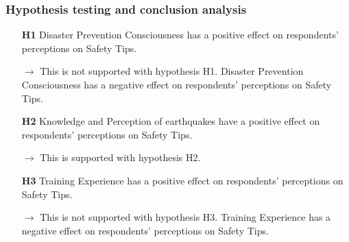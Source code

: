 \begin{table}[h]
  \caption{Discriminant Validity }
  \label{table36}
  \centering
{}
\end{table}

\subsubsection{Hypothesis testing and conclusion analysis}
\begin{itemize}
\item[\textbf{H1}] Disaster Prevention Consciousness has a positive effect on respondents' perceptions on Safety Tips.
\item[\textbf{$\longrightarrow$}] This is not supported with hypothesis H1. Disaster Prevention Consciousness has a negative effect on respondents' perceptions on Safety Tips.
\item[\textbf{H2}] Knowledge and Perception of earthquakes have a positive effect on respondents' perceptions on Safety Tips.
\item[\textbf{$\longrightarrow$}] This is supported with hypothesis H2. 
\item[\textbf{H3}] Training Experience has a positive effect on respondents' perceptions on Safety Tips.
\item[\textbf{$\longrightarrow$}] This is not supported with hypothesis H3. Training Experience has a negative effect on respondents' perceptions on Safety Tips.
\end{itemize}

